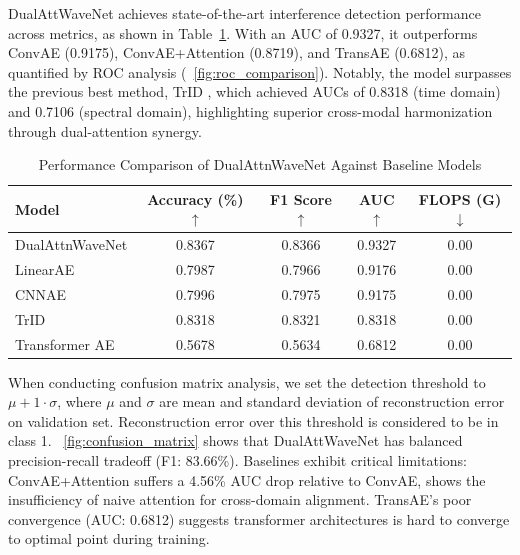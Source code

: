 \documentclass[10pt, conference]{IEEEtran}
\begin{document}
DualAttWaveNet achieves state-of-the-art interference detection performance across metrics, as shown in Table~\ref{tab:main_results}. With an AUC of 0.9327, it outperforms ConvAE (0.9175), ConvAE+Attention (0.8719), and TransAE (0.6812), as quantified by ROC analysis (\figurename~\ref{fig:roc_comparison}). Notably, the model surpasses the previous best method, TrID \cite{saifaldawlaGenAIBasedModelsNGSO2024}, which achieved AUCs of 0.8318 (time domain) and 0.7106 (spectral domain), highlighting superior cross-modal harmonization through dual-attention synergy.


\begin{table}[t]
    \caption{Performance Comparison of DualAttnWaveNet Against Baseline Models}
    \label{tab:main_results}
    \centering
    \begin{tabular}{lcccc}
        \toprule
        \textbf{Model}  & \textbf{Accuracy (\%) } $\uparrow$ & \textbf{F1 Score} $\uparrow$ & \textbf{AUC}$\uparrow$ & \textbf{FLOPS (G)}$\downarrow$ \\
        \midrule
        DualAttnWaveNet & 0.8367                             & 0.8366                       & 0.9327                 & 0.00                           \\
        \cmidrule{1-5}
        LinearAE        & 0.7987                             & 0.7966                       & 0.9176                 & 0.00                           \\
        CNNAE           & 0.7996                             & 0.7975                       & 0.9175                 & 0.00                           \\
        TrID            & 0.8318                             & 0.8321                       & 0.8318                 & 0.00                           \\
        Transformer AE  & 0.5678                             & 0.5634                       & 0.6812                 & 0.00                           \\
        \bottomrule
    \end{tabular}
\end{table}


When conducting confusion matrix analysis, we set the detection threshold to $\mu + 1 \cdot \sigma$, where $\mu$ and $\sigma$ are mean and standard deviation of reconstruction error on validation set.  Reconstruction error over this threshold is considered to be in class 1. \figurename~\ref{fig:confusion_matrix} shows that DualAttWaveNet has balanced precision-recall tradeoff (F1: 83.66\%). Baselines exhibit critical limitations: ConvAE+Attention suffers a 4.56\% AUC drop relative to ConvAE, shows  the insufficiency of naive attention for cross-domain alignment. TransAE’s poor convergence (AUC: 0.6812) suggests transformer architectures is hard to converge to optimal point during training.
\end{document}
